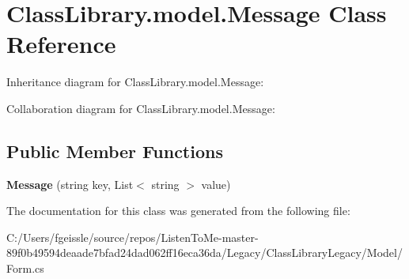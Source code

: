 \hypertarget{class_class_library_1_1model_1_1_message}{}\section{Class\+Library.\+model.\+Message Class Reference}
\label{class_class_library_1_1model_1_1_message}


Inheritance diagram for Class\+Library.\+model.\+Message\+:


Collaboration diagram for Class\+Library.\+model.\+Message\+:
\subsection*{Public Member Functions}
\begin{DoxyCompactItemize}
\item 
\mbox{\label{class_class_library_1_1model_1_1_message_a1e3d01589348202d3ac3a2c238fc5719}} 
{\bfseries Message} (string key, List$<$ string $>$ value)
\end{DoxyCompactItemize}


The documentation for this class was generated from the following file\+:\begin{DoxyCompactItemize}
\item 
C\+:/\+Users/fgeissle/source/repos/\+Listen\+To\+Me-\/master-\/89f0b49594deaade7bfad24dad062ff16eca36da/\+Legacy/\+Class\+Library\+Legacy/\+Model/Form.\+cs\end{DoxyCompactItemize}
